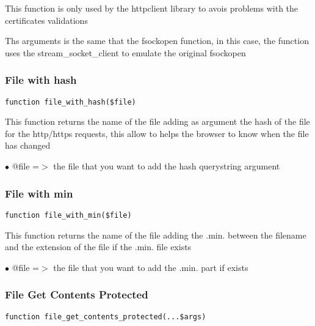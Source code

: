 \documentclass[a4paper]{article}
\begin{document}
This function is only used by the httpclient library to avois problems with
the certificates validations

Ths arguments is the same that the fsockopen function, in this case, the
function uses the stream\_socket\_client to emulate the original fsockopen

\hypertarget{toc142}{}
\subsubsection{File with hash}

\begin{lstlisting}
function file_with_hash($file)
\end{lstlisting}

This function returns the name of the file adding as argument the hash
of the file for the http/https requests, this allow to helps the browser
to know when the file has changed

\begin{compactitem}
\item[\color{myblue}$\bullet$] @file =$>$ the file that you want to add the hash querystring argument
\end{compactitem}

\hypertarget{toc143}{}
\subsubsection{File with min}

\begin{lstlisting}
function file_with_min($file)
\end{lstlisting}

This function returns the name of the file adding the .min. between the
filename and the extension of the file if the .min. file exists

\begin{compactitem}
\item[\color{myblue}$\bullet$] @file =$>$ the file that you want to add the .min. part if exists
\end{compactitem}

\hypertarget{toc144}{}
\subsubsection{File Get Contents Protected}

\begin{lstlisting}
function file_get_contents_protected(...$args)
\end{lstlisting}
\end{document}
